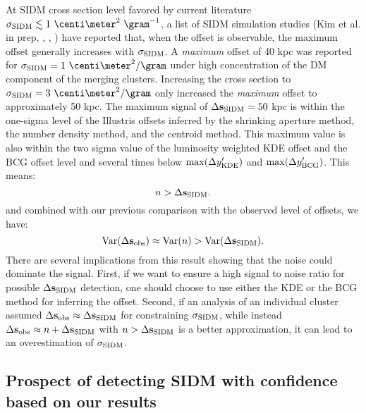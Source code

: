 At SIDM cross section level favored by current literature $\sigmaSIDM
\lesssim 1~\centi\meter^2 ~\gram^{-1}$, a list of SIDM simulation studies (Kim
et al. in prep, \citealt{Robertson2016}, \citealt{Kahlhoefer14}, \citealt{Randall2008d})
have reported that, when the offset is observable, 
the maximum offset generally increases with $\sigma_{\rm SIDM}$. 
A {\it maximum} offset of 40 kpc was reported for $\sigmaSIDM = 1
~\centi\meter^2 / \gram$ under high concentration of the DM component of the 
merging clusters. Increasing the cross section to $\sigmaSIDM = 3
~\centi\meter^2 / \gram$ only increased the {\it maximum} offset to 
approximately 50 kpc.
The maximum signal of $\Delta {\bf s}_{\rm SIDM} = 50$ kpc is within 
the one-sigma level of the Illustris offsets 
inferred by the shrinking aperture method, the number density method, and the
centroid method. This maximum value is also within the two sigma value of the
luminosity weighted KDE offset and the BCG offset level and several times below
$\max(\Delta y_{\rm KDE}')$ and $\max(\Delta y_{\rm BCG}')$. 
This means:
\begin{equation}
	n > \Delta {\bf s}_{\rm SIDM}.
\end{equation}
and combined with our previous comparison with the observed level of offsets,
we have:
\begin{equation}
	\mathrm{Var}(\Delta {\bf s}_{\rm obs}) \approx \mathrm{Var}(n) > \mathrm{Var}(\Delta {\bf s}_{\rm SIDM}).
\end{equation}
There are several implications from this result showing that the 
noise could dominate the signal. 
First, if we want to ensure a high signal to noise ratio for possible
$\Delta {\bf s}_{\rm SIDM}$ detection, one should choose to use either the KDE or the 
BCG method for inferring the offset.
Second, if an analysis of an individual cluster assumed $\Delta {\bf s}_{\rm obs} \approx \Delta {\bf s}_{\rm SIDM}$ 
for constraining $\sigma_{\rm SIDM}$,
while instead $\Delta {\bf s}_{\rm obs} \approx n + \Delta {\bf s}_{\rm SIDM}$ with $n >
\Delta {\bf s}_{\rm SIDM}$ is a better approximation, it  
can lead to an overestimation of $\sigma_{\rm SIDM}$. 

\subsection{Prospect of detecting SIDM with confidence based on our results} 
\label{subsec:prospect_of_detecting_SIDM}

